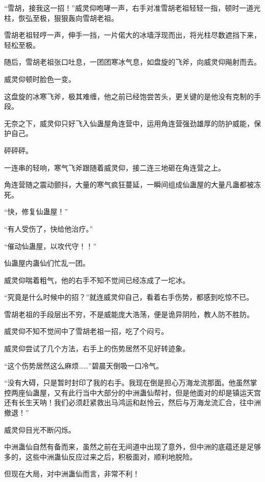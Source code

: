 
\begin{this_body}

“雪胡，接我这一招！”威灵仰咆哮一声，右手对准雪胡老祖轻轻一指，顿时一道光柱，恢弘至极，狠狠轰向雪胡老祖。

雪胡老祖轻哼一声，伸手一挡，一片偌大的冰墙浮现而出，将光柱尽数遮挡下来，轻松至极。

随后，雪胡老祖张口吐息，一团团寒冰气息，如盘旋的飞斧，向威灵仰飚射而去。

威灵仰顿时脸色一变。

这盘旋的冰寒飞斧，极其难缠，他之前已经饱尝苦头，更关键的是他没有克制的手段。

无奈之下，威灵仰只好飞入仙蛊屋角连营中，运用角连营强劲雄厚的防护威能，保护自己。

砰砰砰。

一连串的轻响，寒气飞斧跟随着威灵仰，接二连三地砸在角连营之上。

角连营随之震动颤抖，大量的寒气疯狂蔓延，一瞬间组成仙蛊屋的大量凡蛊都被冻死。

“快，修复仙蛊屋！”

“有人受伤了，快给他治疗。”

“催动仙蛊屋，以攻代守！！”

仙蛊屋内蛊仙们忙乱一团。

威灵仰喘着粗气，他的右手不知不觉间已经冻成了一坨冰。

“究竟是什么时候中的招？”就连威灵仰自己，看着右手伤势，都感到吃惊不已。

雪胡老祖的手段层出不穷，不是威能庞大浩荡，便是诡异阴险，教人防不胜防。

威灵仰不知不觉间中了雪胡老祖一招，吃了个闷亏。

威灵仰尝试了几个方法，右手上的伤势居然不见好转迹象。

“这个伤势居然这么麻烦……”碧晨天倒吸一口冷气。

“没有大碍，只是暂时封印了我的右手。我现在倒是担心万海龙流那面。他虽然掌控两座仙蛊屋，又有此行当中大部分的中洲蛊仙帮衬，但是他面对的却是镇运天宫还有长生天呐！我们必须赶紧救出马鸿运和赵怜云，然后与万海龙流汇合，往中洲撤退！”

威灵仰目光不断闪烁。

中洲蛊仙自然有备而来，虽然之前在无间道中出现了意外，但中洲的底蕴还是足够多的，这些中洲蛊仙反应过来之后，积极面对，顺利地脱险。

但现在大局，对中洲蛊仙而言，非常不利！


\end{this_body}

